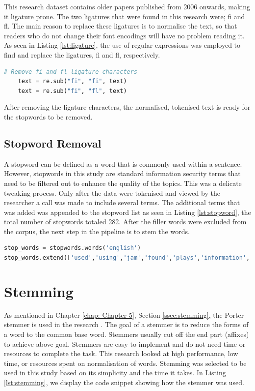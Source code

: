 This research dataset contains older papers published from 2006 onwards, making it ligature prone. The two ligatures that were found in this research were; fi and fl. The main reason to replace these ligatures is to normalise the text, so that readers who do not change their font encodings will have no problem reading it. 
As seen in Listing \ref{lst:ligature}, the use of regular expressions was employed to find and replace the ligatures, fi and fl, respectively.

\begin{lstlisting}[language=Python, label={lst:ligature}, caption=Replacing Ligature Characters]
    # Remove fi and fl ligature characters
    text = re.sub("fi", "fi", text)
    text = re.sub("fi", "fl", text)
\end{lstlisting}

After removing the ligature characters, the normalised, tokenised text is ready for the stopwords to be removed.

\subsection{Stopword Removal}



A stopword can be defined as a word that is commonly used within a sentence. However, stopwords in this study are standard information security terms that need to be filtered out to enhance the quality of the topics. This was a delicate tweaking process. Only after the data were tokenised and viewed by the researcher a call was made to include several terms. The additional terms that was added was appended to the stopword list as seen in Listing \ref{lst:stopword}, the total number of stopwords totaled 282. After the filler words were excluded from the corpus, the next step in the pipeline is to stem the words.

\begin{lstlisting}[language=Python,label={lst:stopword}, caption=Stopwords code]
stop_words = stopwords.words('english')
stop_words.extend(['used','using','jam','found','plays','information','security','network', 'technology', 'bgp'])
\end{lstlisting}

\section{Stemming}

As mentioned in Chapter \ref{chap: Chapter 5}, Section \ref{ssec:stemming}, the Porter stemmer is used in the research \cite{porter1980algorithm}. The goal of a stemmer is to reduce the forms of a word to the common base word. Stemmers usually cut off the end part (affixes) to achieve above goal.
Stemmers are easy to implement and do not need time or resources to complete the task. This research looked at high performance, low time, or resources spent on normalisation of words. Stemming was selected to be used in this study based on its simplicity and the time it takes.
In Listing \ref{lst:stemming}, we display the code snippet showing how the stemmer was used.

